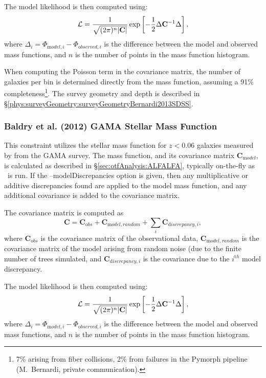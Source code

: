 The model likelihood is then computed using:
\begin{equation}
 \mathcal{L} = {1 \over \sqrt{(2 \pi)^n |{\mathbf C}|}} \exp\left[ -{1\over 2} \Delta {\mathbf C}^{-1} \Delta \right],
\end{equation}
where $\Delta_i = \Phi_{{\mathrm model}, i} - \Phi_{{\mathrm observed}, i}$ is the difference between the model and observed mass functions, and $n$ is the number of points in the mass function histogram.

When computing the Poisson term in the covariance matrix, the number of galaxies per bin is determined directly from the mass function, assuming a 91\% completeness\footnote{7\% arising from fiber collisions, 2\% from failures in the Pymorph pipeline (M.~Bernardi, private communication).}. The survey geometry and depth is described in \S\ref{phys:surveyGeometry:surveyGeometryBernardi2013SDSS}.

\subsubsection{Baldry et al. (2012) GAMA Stellar Mass Function}\label{sec:AnalysisBaldryGAMAStellarMassFunction}

This constraint utilizes the stellar mass function for $z< 0.06$ galaxies measured by \cite{baldry_galaxy_2012} from the GAMA survey. The mass function, and its covariance matrix ${\mathbf C}_{\mathrm model}$, is calculated as described in \S\ref{sec:otfAnalysis:ALFALFA}, typically on-the-fly as \glc\ is run. If the {\normalfont \ttfamily --modelDiscrepancies} option is given, then any multiplicative or additive discrepancies found are applied to the model mass function, and any additional covariance is added to the covariance matrix.

The covariance matrix is computed as
\begin{equation}
 {\mathbf C} = {\mathbf C}_{\mathrm obs} + {\mathbf C}_{\mathrm model,random} + \sum_i {\mathbf C}_{{\mathrm discrepancy}, i},
\end{equation}
where ${\mathbf C}_{\mathrm obs}$ is the covariance matrix of the observational data, ${\mathbf C}_{\mathrm model,random}$ is the covariance matrix of the model arising from random noise (due to the finite number of trees simulated, and ${\mathbf C}_{{\mathrm discrepancy}, i}$ is the covariance due to the $i^{\mathrm th}$ model discrepancy.

The model likelihood is then computed using:
\begin{equation}
 \mathcal{L} = {1 \over \sqrt{(2 \pi)^n |{\mathbf C}|}} \exp\left[ -{1\over 2} \Delta {\mathbf C}^{-1} \Delta \right],
\end{equation}
where $\Delta_i = \Phi_{{\mathrm model}, i} - \Phi_{{\mathrm observed}, i}$ is the difference between the model and observed mass functions, and $n$ is the number of points in the mass function histogram.

